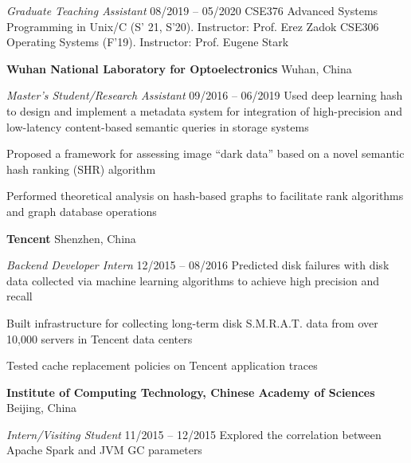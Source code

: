 \documentclass[letterpaper,10pt,oneside]{article}
\begin{document}
\begin{body}
\emph{Graduate Teaching Assistant}
\hfill
08/2019 --
05/2020
\GapNoBreak
\BulletItem
CSE376 Advanced Systems Programming in Unix/C (S' 21, S'20). Instructor: Prof. Erez Zadok
\GapNoBreak
\BulletItem
CSE306 Operating Systems (F'19). Instructor: Prof. Eugene Stark


\BigGap
{\textbf{Wuhan National Laboratory for Optoelectronics}}
\hfill
Wuhan, China

\emph{Master's Student/Research Assistant}
\hfill
09/2016 --
06/2019
\GapNoBreak
\BulletItem
Used deep learning hash to design and implement a metadata system for integration of high-precision and low-latency content-based semantic queries in storage systems

\GapNoBreak
\BulletItem
Proposed a framework for assessing image ``dark data'' based on a novel semantic hash ranking (SHR) algorithm

\GapNoBreak
\BulletItem
Performed theoretical analysis on hash-based graphs to facilitate rank algorithms and graph database operations


\BigGap
{\textbf{Tencent}} %
\hfill
Shenzhen, China

\emph{Backend Developer Intern}
\hfill
12/2015 --
08/2016
\GapNoBreak
\BulletItem
Predicted disk failures with disk data collected via machine learning algorithms to achieve high precision and recall

\GapNoBreak
\BulletItem
Built infrastructure for collecting long-term disk S.M.R.A.T. data from over 10,000 servers in Tencent data centers

\GapNoBreak
\BulletItem
Tested cache replacement policies on Tencent application traces

\BigGap
{\textbf{Institute of Computing Technology, Chinese Academy of Sciences}}
\hfill
Beijing, China

\emph{Intern/Visiting Student}
\hfill
11/2015 --
12/2015
\GapNoBreak
\BulletItem
Explored the correlation between Apache Spark and JVM GC parameters


\end{body}
\end{document}
